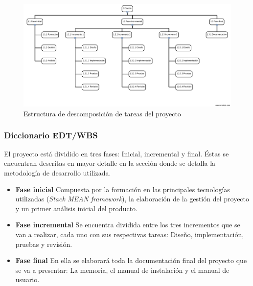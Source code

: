 \begin{landscape}

\begin{figure}[htbp] 
    \centering
    \includegraphics[height=0.75\textwidth,keepaspectratio]{figuras/edt_v1_en.png}
    \caption{Estructura de descomposición de tareas del proyecto}
    \label{fig:edt}
\end{figure}	

\end{landscape}


\subsubsection{Diccionario EDT/WBS}
El proyecto está dividido en tres fases: Inicial, incremental y final. Éstas se encuentran descritas en mayor detalle en la sección donde se detalla la metodología de desarrollo utilizada.

\begin{itemize}[label={}]
\item \textbf{Fase inicial}
Compuesta por la formación en las principales tecnologías utilizadas (\textit{Stack MEAN framework}), la elaboración de la gestión del proyecto y un primer análisis inicial del producto.
\item \textbf{Fase incremental}
Se encuentra dividida entre los tres incrementos que se van a realizar, cada uno con sus respectivas tareas: Diseño, implementación, pruebas y revisión.
\item \textbf{Fase final}
En ella se elaborará toda la documentación final del proyecto que se va a presentar: La memoria, el manual de instalación y el manual de usuario.
\end{itemize} 


